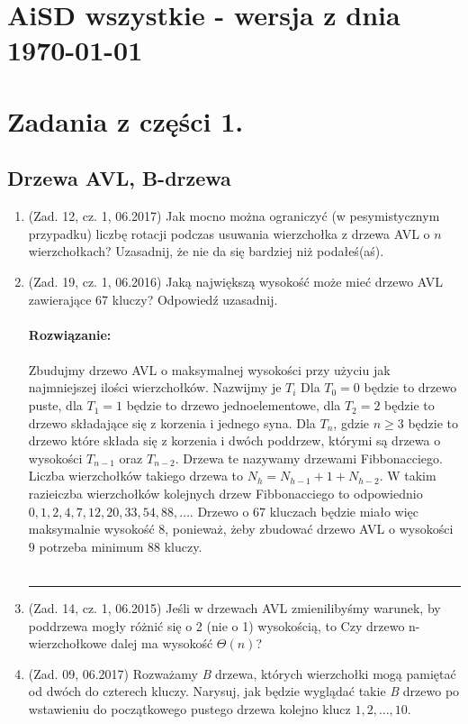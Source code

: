\documentclass[10pt]{article}%
\newcommand{\beginsolution}{\textbf{\\~\\ \textbf{Rozwiązanie:} \\~\\}}
\newcommand{\finishsolution}{\\~\\ \noindent\rule{11cm}{0.4pt}}
\begin{document}
\section*{AiSD wszystkie - wersja z dnia \today}


\section*{Zadania z części 1.}


\subsection*{Drzewa AVL, B-drzewa}

\begin{enumerate}

\item (Zad. 12, cz. 1, 06.2017) Jak mocno można ograniczyć (w pesymistycznym przypadku) liczbę rotacji podczas usuwania wierzchołka z drzewa AVL o $n$ wierzchołkach? Uzasadnij, że nie da się bardziej niż podałeś(aś).

\item (Zad. 19, cz. 1, 06.2016) Jaką największą wysokość może mieć drzewo AVL zawierające 67 kluczy? Odpowiedź uzasadnij.
\beginsolution
Zbudujmy drzewo AVL o maksymalnej wysokości przy użyciu jak najmniejszej ilości wierzchołków. Nazwijmy je $T_i$ Dla $T_0 = 0$ będzie to drzewo puste, dla $T_1 = 1$ będzie to drzewo jednoelementowe, dla $T_2 = 2$ będzie to drzewo składające się z korzenia i jednego syna. Dla $T_n$, gdzie $n \geq 3$ będzie to drzewo które składa się z korzenia i dwóch poddrzew, którymi są drzewa o wysokości $T_{n-1}$ oraz $T_{n-2}$. Drzewa te nazywamy drzewami Fibbonacciego. Liczba wierzchołków takiego drzewa to $N_h = N_{h-1} + 1 + N_{h-2}$. W takim razieiczba wierzchołków kolejnych drzew Fibbonacciego to odpowiednio $0, 1, 2, 4, 7, 12, 20, 33, 54, 88, \ldots $. Drzewo o 67 kluczach będzie miało więc maksymalnie wysokość 8, ponieważ, żeby zbudować drzewo AVL o wysokości $9$ potrzeba minimum 88 kluczy. 
\finishsolution

\item (Zad. 14, cz. 1, 06.2015) Jeśli w drzewach AVL zmienilibyśmy warunek, by poddrzewa mogły różnić się o 2 (nie o 1) wysokością, to Czy drzewo n-wierzchołkowe dalej ma wysokość $\Theta(n)$? 

\item (Zad. 09, 06.2017) Rozważamy \emph{B} drzewa, których wierzchołki mogą pamiętać od dwóch do czterech kluczy. Narysuj, jak będzie wyglądać takie \emph{B} drzewo po wstawieniu do początkowego pustego drzewa kolejno klucz $1,2,\ldots,10$.

\end{enumerate}
\end{document}
